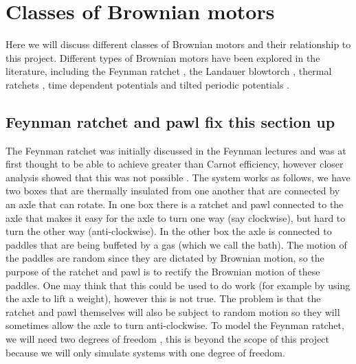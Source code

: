 \section{Classes of Brownian motors} \label{BrownianMotorClasses}
Here we will discuss different classes of Brownian motors and their relationship to this project. Different types of Brownian motors have been explored in the literature, including the Feynman ratchet \cite{Feynman1963}, the Landauer blowtorch \cite{Landauer1988}, thermal ratchets \cite{Pedro2014}, time dependent potentials \cite{JoelBader1999,BlickleBechinger2011} and tilted periodic potentials \cite{Leibler1993,Magnasco1994}.

\subsection{Feynman ratchet and pawl {\color{red} fix this section up}}
The Feynman ratchet was initially discussed in the Feynman lectures \cite{Feynman1963} and was at first thought to be able to achieve greater than Carnot efficiency, however closer analysis showed that this was not possible \cite{ParrondoEspanol1996}. The system works as follows, we have two boxes that are thermally insulated from one another that are connected by an axle that can rotate. In one box there is a ratchet and pawl connected to the axle that makes it easy for the axle to turn one way (say clockwise), but hard to turn the other way (anti-clockwise). In the other box the axle is connected to paddles that are being buffeted by a gas (which we call the bath). The motion of the paddles are random since they are dictated by Brownian motion, so the purpose of the ratchet and pawl is to rectify the Brownian motion of these paddles. One may think that this could be used to do work (for example by using the axle to lift a weight), however this is not true. The problem is that the ratchet and pawl themselves will also be subject to random motion so they will sometimes allow the axle to turn anti-clockwise. To model the Feynman ratchet, we will need two degrees of freedom \cite{M.W.Jack2016}, this is beyond the scope of this project because we will only simulate systems with one degree of freedom.


